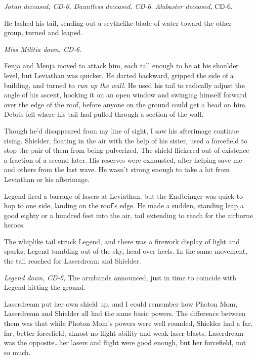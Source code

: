 \emph{Jotun deceased, CD-6.  Dauntless deceased, CD-6}.  \emph{Alabaster deceased,} CD-6.



He lashed his tail, sending out a scythelike blade of water toward the other group, turned and leaped.



\emph{Miss Militia down, CD-6.}



Fenja and Menja moved to attack him, each tall enough to be at his shoulder level, but Leviathan was quicker.  He darted backward, gripped the side of a building, and turned to \emph{run up the wall. } He used his tail to radically adjust the angle of his ascent, hooking it on an open window and swinging himself forward over the edge of the roof, before anyone on the ground could get a bead on him.  Debris fell where his tail had pulled through a section of the wall.



Though he'd disappeared from my line of sight, I saw his afterimage continue rising.  Shielder, floating in the air with the help of his sister, used a forcefield to stop the pair of them from being pulverized.  The shield flickered out of existence a fraction of a second later.  His reserves were exhausted, after helping save me and others from the last wave.  He wasn't strong enough to take a hit from Leviathan or his afterimage.



Legend fired a barrage of lasers at Leviathan, but the Endbringer was quick to hop to one side, landing on the roof's edge.  He made a sudden, standing leap a good eighty or a hundred feet into the air, tail extending to reach for the airborne heroes.



The whiplike tail struck Legend, and there was a firework display of light and sparks, Legend tumbling out of the sky, head over heels.  In the same movement, the tail reached for Laserdream and Shielder.



\emph{Legend down, CD-6,  }The armbands announced, just in time to coincide with Legend hitting the ground.



Laserdream put her own shield up, and I could remember how Photon Mom, Laserdream and Shielder all had the same basic powers.  The difference between them was that while Photon Mom's powers were well rounded, Shielder had a far, far, better forcefield, almost no flight ability and weak laser blasts.  Laserdream was the opposite\ldots her lasers and flight were good enough, but her forcefield, not so much.



